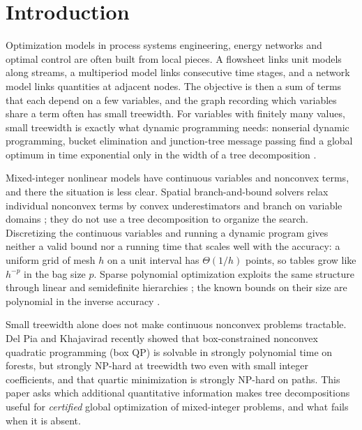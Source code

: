 \section{Introduction}\label{sec:intro}

Optimization models in process systems engineering, energy networks and
optimal control are often built from local pieces. A flowsheet links unit
models along streams, a multiperiod model links consecutive time stages, and a
network model links quantities at adjacent nodes. The objective is then a sum
of terms that each depend on a few variables, and the graph recording which
variables share a term often has small treewidth. For variables with finitely
many values, small treewidth is exactly what dynamic programming needs:
nonserial dynamic programming, bucket elimination and junction-tree message
passing find a global optimum in time exponential only in the width of a tree
decomposition \cite{BerteleBrioschi1972,Dechter1999,KollerFriedman2009}.

Mixed-integer nonlinear models have continuous variables and nonconvex
terms, and there the situation is less clear. Spatial branch-and-bound
solvers relax individual nonconvex terms by convex underestimators and branch
on variable domains \cite{TawarmalaniSahinidis2005,BelottiEtAl2009,
MisenerFloudas2014,BelottiEtAl2013}; they do not use a tree decomposition to
organize the search. Discretizing the continuous variables and running a
dynamic program gives neither a valid bound nor a running time that scales
well with the accuracy: a uniform grid of mesh $h$ on a unit interval has
$\Theta(1/h)$ points, so tables grow like $h^{-p}$ in the bag size $p$. Sparse
polynomial optimization exploits the same structure through linear and
semidefinite hierarchies \cite{WakiEtAl2006,Lasserre2006,BienstockMunoz2018};
the known bounds on their size are polynomial in the inverse accuracy
\cite{BienstockMunoz2018,KordaMagronRiosZertuche2025}.

Small treewidth alone does not make continuous nonconvex problems
tractable. Del Pia and Khajavirad
\cite[Theorems~1--3]{DelPiaKhajavirad2026} recently showed that
box-constrained nonconvex quadratic programming (box QP) is solvable in
strongly polynomial time on forests, but strongly NP-hard at treewidth two
even with small integer coefficients, and that quartic minimization is
strongly NP-hard on paths. This paper asks which additional quantitative information makes
tree decompositions useful for \emph{certified} global optimization of
mixed-integer problems, and what fails when it is absent.

